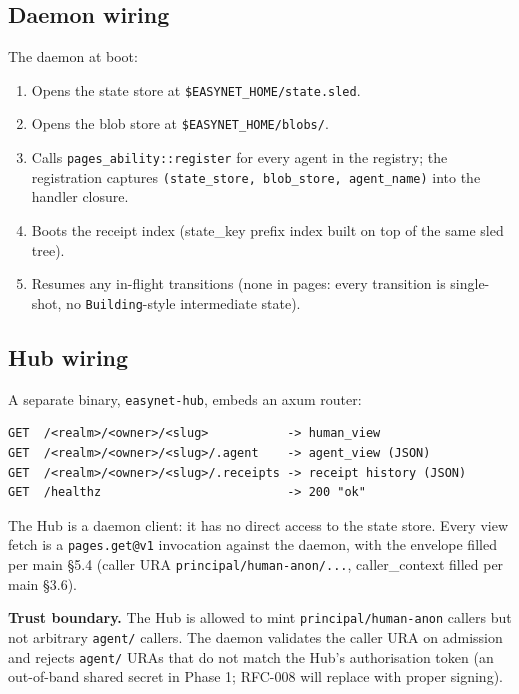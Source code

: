 \documentclass[11pt,a4paper]{article}
\theoremstyle{definition}
\begin{document}
\subsection{Daemon wiring}

The daemon at boot:

\begin{enumerate}[leftmargin=2.2em,itemsep=0.2em]
    \item Opens the state store at \texttt{\$EASYNET\_HOME/state.sled}.
    \item Opens the blob store at \texttt{\$EASYNET\_HOME/blobs/}.
    \item Calls \texttt{pages\_ability::register} for every agent
    in the registry; the registration captures
    \texttt{(state\_store, blob\_store, agent\_name)} into the
    handler closure.
    \item Boots the receipt index (state\_key prefix index built
    on top of the same sled tree).
    \item Resumes any in-flight transitions
    (none in pages: every transition is single-shot, no
    \texttt{Building}-style intermediate state).
\end{enumerate}

\subsection{Hub wiring}

A separate binary, \texttt{easynet-hub}, embeds an axum router:

\begin{lstlisting}
GET  /<realm>/<owner>/<slug>           -> human_view
GET  /<realm>/<owner>/<slug>/.agent    -> agent_view (JSON)
GET  /<realm>/<owner>/<slug>/.receipts -> receipt history (JSON)
GET  /healthz                          -> 200 "ok"
\end{lstlisting}

The Hub is a daemon client: it has no direct access to the
state store. Every view fetch is a \texttt{pages.get@v1}
invocation against the daemon, with the envelope filled per
main \S5.4 (caller URA \texttt{principal/human-anon/...},
caller\_context filled per main \S3.6).

\textbf{Trust boundary.} The Hub is allowed to mint
\texttt{principal/human-anon} callers but not arbitrary
\texttt{agent/} callers. The daemon validates the caller URA on
admission and rejects \texttt{agent/} URAs that do not match
the Hub's authorisation token (an out-of-band shared secret in
Phase 1; RFC-008 will replace with proper signing).
\end{document}
